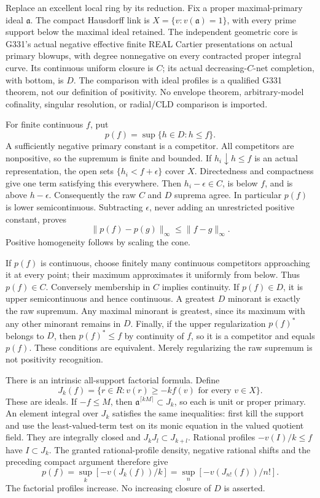 \documentclass[11pt]{article}
\begin{document}
Replace an excellent local ring by its reduction. Fix a proper maximal-primary ideal \(\mathfrak a\). The compact Hausdorff link is \(X=\{v:v(\mathfrak a)=1\}\), with every prime support below the maximal ideal retained. The independent geometric core is G331's actual negative effective finite REAL Cartier presentations on actual primary blowups, with degree nonnegative on every contracted proper integral curve. Its continuous uniform closure is \(C\); its actual decreasing-\(C\)-net completion, with bottom, is \(D\). The comparison with ideal profiles is a qualified G331 theorem, not our definition of positivity. No envelope theorem, arbitrary-model cofinality, singular resolution, or radial/CLD comparison is imported.

For finite continuous \(f\), put
\[
p(f)=\sup\{h\in D:h\le f\}.
\]
A sufficiently negative primary constant is a competitor. All competitors are nonpositive, so the supremum is finite and bounded. If \(h_i\downarrow h\le f\) is an actual representation, the open sets \(\{h_i<f+\epsilon\}\) cover \(X\). Directedness and compactness give one term satisfying this everywhere. Then \(h_i-\epsilon\in C\), is below \(f\), and is above \(h-\epsilon\). Consequently the raw \(C\) and \(D\) suprema agree. In particular \(p(f)\) is lower semicontinuous. Subtracting \(\epsilon\), never adding an unrestricted positive constant, proves
\[
\|p(f)-p(g)\|_\infty\le\|f-g\|_\infty.
\]
Positive homogeneity follows by scaling the cone.

If \(p(f)\) is continuous, choose finitely many continuous competitors approaching it at every point; their maximum approximates it uniformly from below. Thus \(p(f)\in C\). Conversely membership in \(C\) implies continuity. If \(p(f)\in D\), it is upper semicontinuous and hence continuous. A greatest \(D\) minorant is exactly the raw supremum. Any maximal minorant is greatest, since its maximum with any other minorant remains in \(D\). Finally, if the upper regularization \(p(f)^*\) belongs to \(D\), then \(p(f)^*\le f\) by continuity of \(f\), so it is a competitor and equals \(p(f)\). These conditions are equivalent. Merely regularizing the raw supremum is not positivity recognition.

There is an intrinsic all-support factorial formula. Define
\[
J_k(f)=\{r\in R:v(r)\ge-kf(v)\text{ for every }v\in X\}.
\]
These are ideals. If \(-f\le M\), then \(\mathfrak a^{\lceil kM\rceil}\subset J_k\), so each is unit or proper primary. An element integral over \(J_k\) satisfies the same inequalities: first kill the support and use the least-valued-term test on its monic equation in the valued quotient field. They are integrally closed and \(J_kJ_l\subset J_{k+l}\). Rational profiles \(-v(I)/k\le f\) have \(I\subset J_k\). The granted rational-profile density, negative rational shifts and the preceding compact argument therefore give
\[
p(f)=\sup_k[-v(J_k(f))/k]
     =\sup_n[-v(J_{n!}(f))/n!].
\]
The factorial profiles increase. No increasing closure of \(D\) is asserted.
\end{document}
